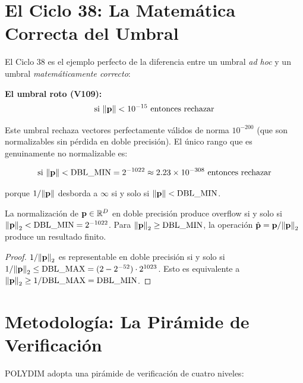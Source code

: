 \section{El Ciclo 38: La Matemática Correcta del Umbral}

El Ciclo 38 es el ejemplo perfecto de la diferencia entre un umbral \textit{ad hoc}
y un umbral \textit{matemáticamente correcto}:

\textbf{El umbral roto (V109):}
\begin{equation}
\text{si } \norm{\mathbf{p}} < 10^{-15} \text{ entonces rechazar}
\end{equation}

Este umbral rechaza vectores perfectamente válidos de norma $10^{-200}$ (que
son normalizables sin pérdida en doble precisión). El único rango que es
genuinamente no normalizable es:

\begin{equation}
\text{si } \norm{\mathbf{p}} < \text{DBL\_MIN} = 2^{-1022} \approx 2.23 \times 10^{-308} \text{ entonces rechazar}
\end{equation}

porque $1/\norm{\mathbf{p}}$ desborda a $\infty$ si y solo si $\norm{\mathbf{p}} < \text{DBL\_MIN}$.

\begin{theorem}
\label{thm:slerp_threshold}
La normalización de $\mathbf{p} \in \mathbb{R}^D$ en doble precisión produce overflow si y solo si
$\norm{\mathbf{p}}_2 < \text{DBL\_MIN} = 2^{-1022}$.
Para $\norm{\mathbf{p}}_2 \ge \text{DBL\_MIN}$, la operación
$\hat{\mathbf{p}} = \mathbf{p}/\norm{\mathbf{p}}_2$ produce un resultado finito.
\end{theorem}

\begin{proof}
$1/\norm{\mathbf{p}}_2$ es representable en doble precisión si y solo si
$1/\norm{\mathbf{p}}_2 \le \text{DBL\_MAX} = (2 - 2^{-52}) \cdot 2^{1023}$.
Esto es equivalente a $\norm{\mathbf{p}}_2 \ge 1/\text{DBL\_MAX} = \text{DBL\_MIN}$.
\end{proof}

\section{Metodología: La Pirámide de Verificación}

POLYDIM adopta una pirámide de verificación de cuatro niveles:

